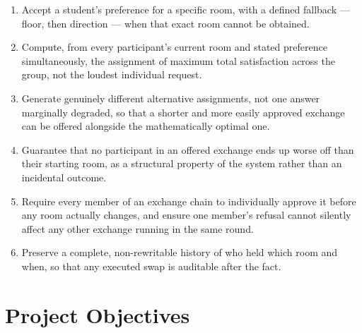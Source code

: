 \documentclass[11pt,a4paper]{report}
\begin{document}
\begin{enumerate}
    \item Accept a student's preference for a specific room, with a
    defined fallback --- floor, then direction --- when that exact
    room cannot be obtained.

    \item Compute, from every participant's current room and stated
    preference simultaneously, the assignment of maximum total
    satisfaction across the group, not the loudest individual request.

    \item Generate genuinely different alternative assignments, not
    one answer marginally degraded, so that a shorter and more easily
    approved exchange can be offered alongside the mathematically
    optimal one.

    \item Guarantee that no participant in an offered exchange ends up
    worse off than their starting room, as a structural property of
    the system rather than an incidental outcome.

    \item Require every member of an exchange chain to individually
    approve it before any room actually changes, and ensure one
    member's refusal cannot silently affect any other exchange running
    in the same round.

    \item Preserve a complete, non-rewritable history of who held
    which room and when, so that any executed swap is auditable after
    the fact.
\end{enumerate}

\section{Project Objectives}
\end{document}
